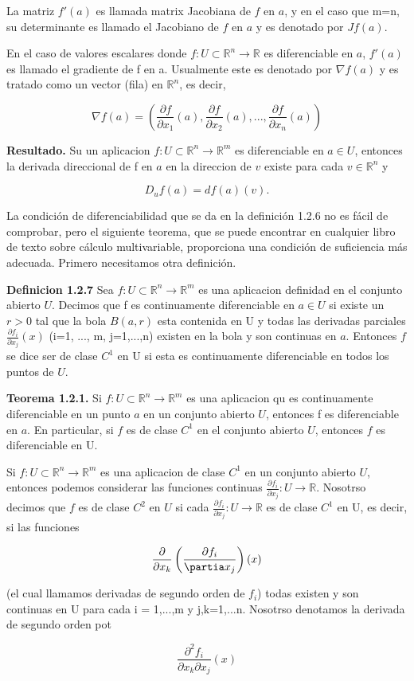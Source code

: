 \documentclass[letterpaper,12pt]{article}
\begin{document}
La matriz $f'(a)$ es llamada matrix Jacobiana de $f$ en $a$, y en el caso que m=n, su determinante es llamado el Jacobiano de $f$ en $a$ y es denotado por $Jf(a)$.

\hfill

En el caso de valores escalares donde $f: U \subset \mathbb{R}^n \to \mathbb{R}$ es diferenciable en $a$, $f'(a)$ es llamado el gradiente de f en a. Usualmente este es denotado por $\nabla f(a)$ y es tratado como un vector (fila) en $\mathbb{R}^n$, es decir,


$$
\nabla f(a) = \left ( \frac{\partial f}{\partial x_1} (a),  \frac{\partial f}{\partial x_2} (a), ...,  \frac{\partial f}{\partial x_n} (a) \right )
$$

\textbf{Resultado.} Su un aplicacion $f: U \subset \mathbb{R}^n \to \mathbb{R}^m$ es diferenciable en $a \in U$, entonces la derivada direccional de f en $a$ en la direccion de $v$ 
existe para cada $v \in \mathbb{R}^n$ y

$$
D_u f(a) = df(a)(v).
$$

La condición de diferenciabilidad que se da en la definición 1.2.6 no es fácil de comprobar, pero el siguiente teorema, que se puede encontrar en cualquier libro de texto sobre cálculo multivariable, proporciona una condición de suficiencia más adecuada. Primero necesitamos otra definición.

\textbf{Definicion 1.2.7} Sea $f: U \subset \mathbb{R}^n \to \mathbb{R}^m$ es una aplicacion definidad en el conjunto abierto $U$. 
Decimos que f es continuamente diferenciable en $a \in U$
si existe un $r > 0$ tal que la bola $B(a,r)$ esta contenida en U y todas las derivadas parciales $\frac{\partial f_i}{\partial x_j}(x)$ (i=1, ..., m, j=1,...,n) existen en la bola y son continuas en $a$. Entonces $f$ se dice
 ser de clase $C^1$ en U si esta es continuamente diferenciable en todos los puntos de $U$.

\hfill

\textbf{Teorema 1.2.1.} Si $f: U \subset \mathbb{R}^n \to \mathbb{R}^m$ es una aplicacion qu es continuamente diferenciable en un punto $a$ en un conjunto abierto $U$, 
entonces f es diferenciable en $a$. En particular, si $f$ es de clase $C^1$ en el conjunto abierto $U$, entonces $f$ es diferenciable en U.

\hfill

Si $f: U \subset \mathbb{R}^n \to \mathbb{R}^m$ es una aplicacion de clase $C^1$ en un conjunto abierto $U$, entonces podemos considerar las 
funciones continuas $\frac{\partial f_i}{\partial x_j}: U \to \mathbb{R}$. Nosotrso decimos que $f$ es de clase $C^2$ en $U$ si cada
$\frac{\partial f_i}{\partial x_j}: U \to \mathbb{R}$ es de clase $C^1$ en U, es decir, si las funciones

$$
\frac{\partial}{\partial x_k} \left ( \frac{\partial f_i}{\partia x_j} \right ) (x)
$$ 

(el cual llamamos derivadas de segundo orden de $f_i$) todas existen y son continuas en U para cada i = 1,...,m y j,k=1,...n. Nosotrso denotamos la derivada
de segundo orden pot

$$
\frac{\partial^2 f_i}{\partial x_k \partial x_j} (x)
$$

 
\end{document}
